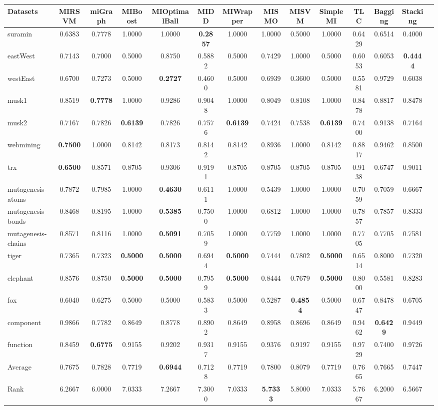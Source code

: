 \begin{threeparttable}
\begin{tabular}{lccccccccccccc}
\toprule
Datasets &MIRSVM &miGraph &MIBoost &MIOptimalBall &MIDD &MIWrapper &MISMO &MISVM &SimpleMI &TLC &Bagging &Stacking \\
\midrule
suramin &0.6383 &0.7778 &1.0000 &1.0000 &\textbf{0.2857} &1.0000 &1.0000 &0.5000 &1.0000 &0.6429 &0.6514 &0.4000 &  \\
eastWest &0.7143 &0.7000 &0.5000 &0.8750 &0.5882 &0.5000 &0.7429 &1.0000 &0.5000 &0.6053 &0.6053 &\textbf{0.4444} &  \\
westEast &0.6700 &0.7273 &0.5000 &\textbf{0.2727} &0.4600 &0.5000 &0.6939 &0.3600 &0.5000 &0.5581 &0.9729 &0.6038 &  \\
musk1 &0.8519 &\textbf{0.7778} &1.0000 &0.9286 &0.9048 &1.0000 &0.8049 &0.8108 &1.0000 &0.8478 &0.8817 &0.8478 &  \\
musk2 &0.7167 &0.7826 &\textbf{0.6139} &0.7826 &0.7576 &\textbf{0.6139} &0.7424 &0.7538 &\textbf{0.6139} &0.7400 &0.9138 &0.7164 &  \\
webmining &\textbf{0.7500} &1.0000 &0.8142 &0.8173 &0.8142 &0.8142 &0.8936 &1.0000 &0.8142 &0.8817 &0.9462 &0.8500 &  \\
trx &\textbf{0.6500} &0.8571 &0.8705 &0.9306 &0.9191 &0.8705 &0.8705 &0.8705 &0.8705 &0.9138 &0.6747 &0.9011 &  \\
mutagenesis-atoms &0.7872 &0.7985 &1.0000 &\textbf{0.4630} &0.6111 &1.0000 &0.5439 &1.0000 &1.0000 &0.7059 &0.7059 &0.6667 &  \\
mutagenesis-bonds &0.8468 &0.8195 &1.0000 &\textbf{0.5385} &0.7500 &1.0000 &0.6812 &1.0000 &1.0000 &0.7857 &0.7857 &0.8333 &  \\
mutagenesis-chains &0.8571 &0.8116 &1.0000 &\textbf{0.5091} &0.7059 &1.0000 &0.7759 &1.0000 &1.0000 &0.7705 &0.7705 &0.7581 &  \\
tiger &0.7365 &0.7323 &\textbf{0.5000} &\textbf{0.5000} &0.6944 &\textbf{0.5000} &0.7444 &0.7802 &\textbf{0.5000} &0.6514 &0.8000 &0.7320 &  \\
elephant &0.8576 &0.8750 &\textbf{0.5000} &\textbf{0.5000} &0.7959 &\textbf{0.5000} &0.8444 &0.7679 &\textbf{0.5000} &0.8000 &0.5581 &0.8283 &  \\
fox &0.6040 &0.6275 &0.5000 &0.5000 &0.5833 &0.5000 &0.5287 &\textbf{0.4854} &0.5000 &0.6747 &0.8478 &0.6705 &  \\
component &0.9866 &0.7782 &0.8649 &0.8778 &0.8902 &0.8649 &0.8958 &0.8696 &0.8649 &0.9462 &\textbf{0.6429} &0.9449 &  \\
function &0.8459 &\textbf{0.6775} &0.9155 &0.9202 &0.9317 &0.9155 &0.9376 &0.9197 &0.9155 &0.9729 &0.7400 &0.9726 &  \\
\hline
Average &0.7675 &0.7828 &0.7719 &\textbf{0.6944} &0.7128 &0.7719 &0.7800 &0.8079 &0.7719 &0.7665 &0.7665 &0.7447 &  \\
Rank &6.2667 &6.0000 &7.0333 &7.2667 &7.3000 &7.0333 &\textbf{5.7333} &5.8000 &7.0333 &5.7667 &6.2000 &6.5667 &  \\
\bottomrule
\end{tabular}
\end{threeparttable}
